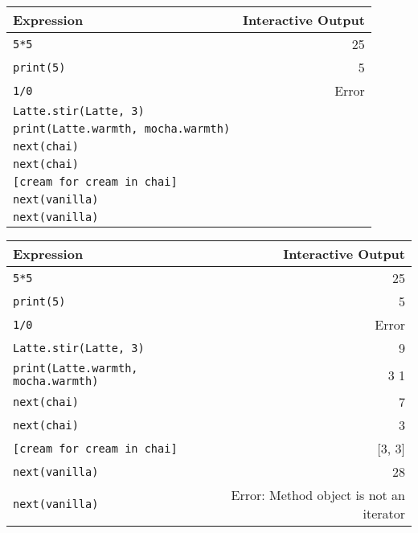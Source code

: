 \begin{tabular}[t]{| l | r |}
\hline
\multicolumn{1}{|l|}{\bf Expression} & {\bf Interactive Output} \\
\hline
\lstinline$5*5$ & 25 \\
\hline
\lstinline$print(5)$ & 5 \\
\hline
\lstinline$1/0$ & {\sc Error} \\
\hline
\lstinline$Latte.stir(Latte, 3)$ &  \\
\hline
\lstinline$print(Latte.warmth, mocha.warmth)$ &  \\ 
\hline
\lstinline$next(chai)$ & \\
\hline
\lstinline$next(chai)$ & \\
\hline
\lstinline$[cream for cream in chai]$ &  \\ 
\hline
\lstinline$next(vanilla)$ &  \\ 
\hline
\lstinline$next(vanilla)$ & \\ 
\hline
\end{tabular}

\begin{solution}
\begin{tabular}[t]{| l | r |}
\hline
\multicolumn{1}{|l|}{\bf Expression} & {\bf Interactive Output} \\
\hline
\lstinline$5*5$ & 25 \\
\hline
\lstinline$print(5)$ & 5 \\
\hline
\lstinline$1/0$ & {\sc Error} \\
\hline
\lstinline$Latte.stir(Latte, 3)$ & 9 \\ 
\hline
\lstinline$print(Latte.warmth, mocha.warmth)$ & 3 1 \\
\hline
\lstinline$next(chai)$ & 7 \\
\hline
\lstinline$next(chai)$ & 3 \\ 
\hline
\lstinline$[cream for cream in chai]$ &  [3, 3]  \\
\hline
\lstinline$next(vanilla)$ & 28 \\ 
\hline
\lstinline$next(vanilla)$ &  {\sc Error}: Method object is not an iterator \\ 
\hline
\end{tabular}


\end{solution}


